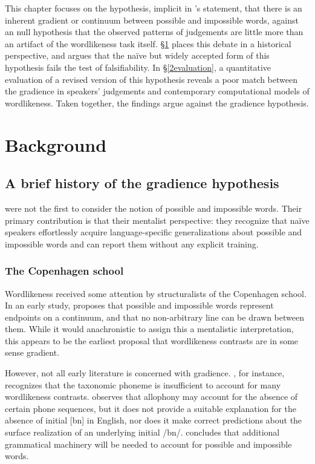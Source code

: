 This chapter focuses on the hypothesis, implicit in \citeauthor{Shademan2006}'s statement, that there is an inherent gradient or continuum between possible and impossible words, against an null hypothesis that the observed patterns of judgements are little more than an artifact of the wordlikeness task itself. \S\ref{2background} places this debate in a historical perspective, and argues that the naïve but widely accepted form of this hypothesis fails the test of falsifiability. In \S\ref{2evaluation}, a quantitative evaluation of a revised version of this hypothesis reveals a poor match between the gradience in speakers' judgements and contemporary computational models of wordlikeness. Taken together, the findings argue against the gradience hypothesis.

\section{Background} \label{2background}

\subsection{A brief history of the gradience hypothesis} \label{history}

\citeauthor{Chomsky1965} were not the first to consider the notion of possible and impossible words. Their primary contribution is that their mentalist perspective: they recognize that naïve speakers effortlessly acquire language-specific generalizations about possible and impossible words and can report them without any explicit training.

\subsubsection{The Copenhagen school}

Wordlikeness received some attention by structuralists of the Copenhagen school. In an early study, \citet{Fischer-Jorgensen1952} proposes that possible and impossible words represent endpoints on a continuum, and that no non-arbitrary line can be drawn between them. While it would anachronistic to assign this a mentalistic interpretation, this appears to be the earliest proposal that wordlikeness contrasts are in some sense gradient. 

However, not all early literature is concerned with gradience. \citet[][31]{Vogt1954}, for instance, recognizes that the taxonomic phoneme is insufficient to account for many wordlikeness contrasts. \citeauthor{Vogt1954} observes that allophony may account for the absence of certain phone sequences, but it does not provide a suitable explanation for the absence of initial [bn] in English, nor does it make correct predictions about the surface realization of an underlying initial /bn/. \citeauthor{Vogt1954} concludes that additional grammatical machinery will be needed to account for possible and impossible words. 

